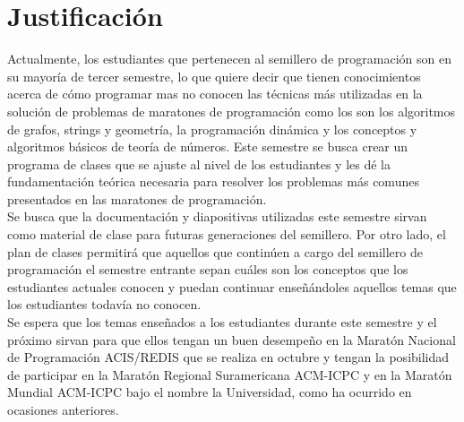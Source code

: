 \documentclass[11pt, oneside]{article}
\theoremstyle{definition}
\theoremstyle{remark}
\begin{document}
\section{Justificación}
Actualmente, los estudiantes que pertenecen al semillero de programación son en su mayoría de tercer semestre, lo que quiere decir que tienen conocimientos acerca de cómo programar mas no conocen las técnicas más utilizadas en la solución de problemas de maratones de programación como los son los algoritmos de grafos, strings y geometría, la programación dinámica y los conceptos y algoritmos básicos de teoría de números. Este semestre se busca crear un programa de clases que se ajuste al nivel de los estudiantes y les dé la fundamentación teórica necesaria para resolver los problemas más comunes presentados en las maratones de programación.\\
Se busca que la documentación y diapositivas utilizadas este semestre sirvan como material de clase para futuras generaciones del semillero. Por otro lado, el plan de clases permitirá que aquellos que continúen a cargo del semillero de programación el semestre entrante sepan cuáles son los conceptos que los estudiantes actuales conocen y puedan continuar enseñándoles aquellos temas que los estudiantes todavía no conocen.\\
Se espera que los temas enseñados a los estudiantes durante este semestre y el próximo sirvan para que ellos tengan un buen desempeño en la Maratón Nacional de Programación ACIS/REDIS que se realiza en octubre y tengan la posibilidad de participar en la Maratón Regional Suramericana ACM-ICPC y en la Maratón Mundial ACM-ICPC bajo el nombre la Universidad, como ha ocurrido en ocasiones anteriores.
\end{document}
